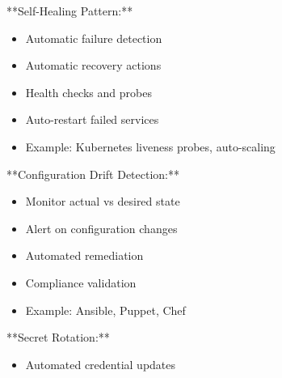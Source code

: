 \documentclass[11pt,a4paper]{article}
\begin{document}
**Self-Healing Pattern:**

\begin{itemize}
\item Automatic failure detection
\end{itemize}

\begin{itemize}
\item Automatic recovery actions
\end{itemize}

\begin{itemize}
\item Health checks and probes
\end{itemize}

\begin{itemize}
\item Auto-restart failed services
\end{itemize}

\begin{itemize}
\item Example: Kubernetes liveness probes, auto-scaling
\end{itemize}

**Configuration Drift Detection:**

\begin{itemize}
\item Monitor actual vs desired state
\end{itemize}

\begin{itemize}
\item Alert on configuration changes
\end{itemize}

\begin{itemize}
\item Automated remediation
\end{itemize}

\begin{itemize}
\item Compliance validation
\end{itemize}

\begin{itemize}
\item Example: Ansible, Puppet, Chef
\end{itemize}

**Secret Rotation:**

\begin{itemize}
\item Automated credential updates
\end{itemize}
\end{document}
